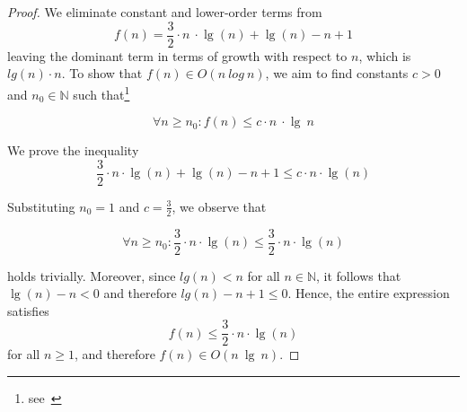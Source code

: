 \begin{proof}
    We eliminate constant and lower-order terms from
    \[
        f(n) = \frac{3}{2} \cdot n\ \cdot \lg(n) + \lg(n) - n + 1
    \]
    \noindent
    leaving the dominant term in terms of growth with respect to $n$, which  is $lg(n) \cdot n$.
    To show that $f(n) \in O(n\ log\ n)$, we aim to find constants $c >0$ and $n_0 \in \mathbb{N}$ such that\footnote{
    see~\cite[11]{GD18a}
    }

    \[
       \forall n \geq n_0: f(n) \leq c \cdot n\ \cdot \lg\ n
    \]

    \noindent
    We prove the inequality
    \[
        \frac{3}{2} \cdot n \cdot \lg(n) + \lg(n) - n + 1 \leq c \cdot n \cdot \lg(n)
    \]

    \noindent
    Substituting $n_0 = 1$ and $c = \frac{3}{2}$, we observe that

    \[
        \forall n \geq n_0: \frac{3}{2} \cdot n \cdot \lg(n)  \leq \frac{3}{2} \cdot n \cdot \lg(n)
    \]

    \noindent
    holds trivially.
    Moreover, since $lg(n) < n$ for all $n \in \mathbb{N}$, it follows that $\lg(n) - n < 0$ and therefore $lg(n) - n + 1 \leq 0$.
    Hence, the entire expression satisfies
    \[
        f(n) \leq \frac{3}{2} \cdot n \cdot \lg(n)
    \]
    \noindent
    for all $n \geq 1$, and therefore $f(n) \in  O(n\ \lg\ n)$.
\end{proof}

